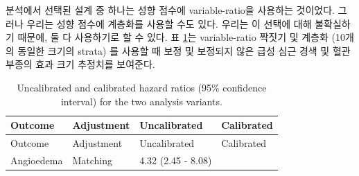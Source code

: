 \documentclass[11pt]{book}
\theoremstyle{definition}
\theoremstyle{definition}
\theoremstyle{definition}
\theoremstyle{remark}
\begin{document}
분석에서 선택된 설계 중 하나는 성향 점수에 variable-ratio을 사용하는
것이었다. 그러나 우리는 성향 점수에 계층화를 사용할 수도 있다. 우리는 이
선택에 대해 불확실하기 때문에, 둘 다 사용하기로 할 수 있다. 표
\ref{tab:sensAnalysis}는 variable-ratio 짝짓기 및 계층화 (10개의 동일한
크기의 strata) 를 사용할 때 보정 및 보정되지 않은 급성 심근 경색 및 혈관
부종의 효과 크기 추정치를 보여준다.

\begin{longtable}[]{@{}llll@{}}
\caption{\label{tab:sensAnalysis} Uncalibrated and calibrated hazard ratios
(95\% confidence interval) for the two analysis
variants.}\tabularnewline
\toprule
\begin{minipage}[b]{0.27\columnwidth}\raggedright\strut
Outcome\strut
\end{minipage} & \begin{minipage}[b]{0.15\columnwidth}\raggedright\strut
Adjustment\strut
\end{minipage} & \begin{minipage}[b]{0.17\columnwidth}\raggedright\strut
Uncalibrated\strut
\end{minipage} & \begin{minipage}[b]{0.17\columnwidth}\raggedright\strut
Calibrated\strut
\end{minipage}\tabularnewline
\midrule
\endfirsthead
\toprule
\begin{minipage}[b]{0.27\columnwidth}\raggedright\strut
Outcome\strut
\end{minipage} & \begin{minipage}[b]{0.15\columnwidth}\raggedright\strut
Adjustment\strut
\end{minipage} & \begin{minipage}[b]{0.17\columnwidth}\raggedright\strut
Uncalibrated\strut
\end{minipage} & \begin{minipage}[b]{0.17\columnwidth}\raggedright\strut
Calibrated\strut
\end{minipage}\tabularnewline
\midrule
\endhead
\begin{minipage}[t]{0.27\columnwidth}\raggedright\strut
Angioedema\strut
\end{minipage} & \begin{minipage}[t]{0.15\columnwidth}\raggedright\strut
Matching\strut
\end{minipage} & \begin{minipage}[t]{0.17\columnwidth}\raggedright\strut
4.32 (2.45 - 8.08)\strut
\end{minipage} & \begin{minipage}[t]{0.17\columnwidth}\raggedright\strut

\end{minipage}
\end{longtable}
\end{document}
